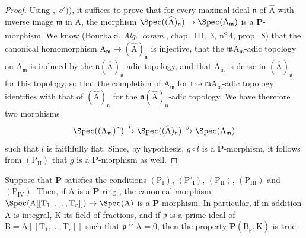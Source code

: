 \begin{proof}
Using ,~$c')$), it suffices to prove that for every maximal ideal $\mathfrak{n}$ of $\widehat{\mathrm{A}}$ with inverse image $\mathfrak{m}$ in $\mathrm{A}$, the morphism $\Spec((\widehat{\mathrm{A}})_\mathfrak{n})\to\Spec(\mathrm{A}_\mathfrak{m})$ is a $\boldsymbol{P}$-morphism.
We know (Bourbaki, \emph{Alg.\ comm.}, chap.~III, \textsection\,3, n\textsuperscript{o}\,4, prop.~8) that the canonical homomorphism $\mathrm{A}_\mathfrak{m}\to(\widehat{\mathrm{A}})_\mathfrak{n}$ is injective, that the $\mathfrak{m}\mathrm{A}_\mathfrak{m}$-adic topology on $\mathrm{A}_\mathfrak{m}$ is induced by the $\mathfrak{n}(\widehat{\mathrm{A}})_\mathfrak{n}$-adic topology, and that $\mathrm{A}_\mathfrak{m}$ is dense in $(\widehat{\mathrm{A}})_\mathfrak{n}$ for this topology, so that the completion of $\mathrm{A}_\mathfrak{m}$ for the $\mathfrak{m}\mathrm{A}_\mathfrak{m}$-adic topology identifies with that of $(\widehat{\mathrm{A}})_\mathfrak{n}$ for the $\mathfrak{n}(\widehat{\mathrm{A}})_\mathfrak{n}$-adic topology.
We have therefore two morphisms
\[
  \Spec((\mathrm{A}_\mathfrak{m})\widehat{\phantom{x}})\xrightarrow{l}\Spec((\widehat{\mathrm{A}})_\mathfrak{n})\xrightarrow{g}\Spec(\mathrm{A}_\mathfrak{m})
\]
such that $l$ is faithfully flat. Since, by hypothesis, $g\circ l$ is a $\boldsymbol{P}$-morphism, it follows from $(\mathrm{P_{II}})$ that $g$ is a $\boldsymbol{P}$-morphism as well.
\end{proof}

\begin{corollary}[7.4.7]
\label{IV.7.4.7}
Suppose that $\boldsymbol{P}$ satisfies the conditions $(\mathrm{P_I})$, $(\mathrm{P}'_\mathrm{I})$, $(\mathrm{P_{II}})$, $(\mathrm{P_{III}})$ and $(\mathrm{P_{IV}})$.
Then, if $\mathrm{A}$ is a $\boldsymbol{P}$-ring , the canonical morphism $\Spec(\mathrm{A}[[\mathrm{T}_1,\ldots,\mathrm{T}_r]])\to\Spec(\mathrm{A})$ is a $\boldsymbol{P}$-morphism.
In particular, if in addition $\mathrm{A}$ is integral, $\mathrm{K}$ its field of fractions, and if $\mathfrak{p}$ is a prime ideal of $\mathrm{B}=\mathrm{A}[[\mathrm{T}_1,\ldots,\mathrm{T}_r]]$ such that $\mathfrak{p}\cap\mathrm{A}=0$, then the property $\boldsymbol{P}(\mathrm{B}_\mathfrak{p},\mathrm{K})$ is true.
\end{corollary}

